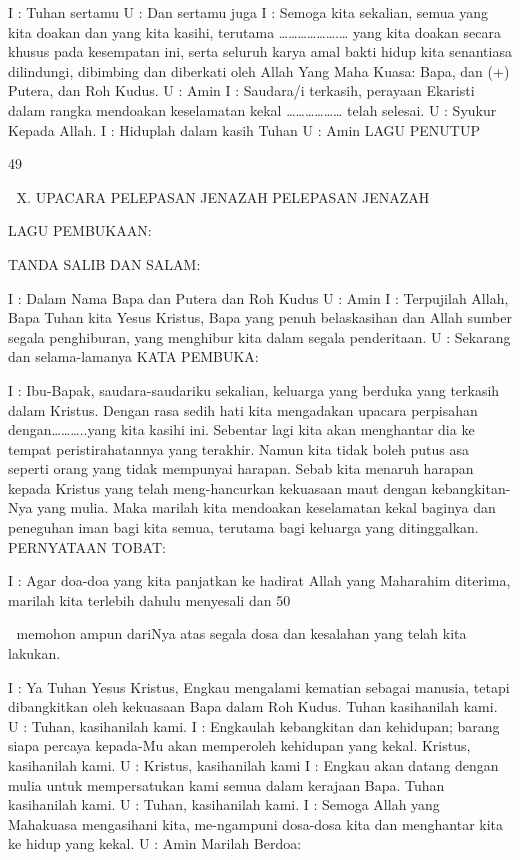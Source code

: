 \documentclass[10pt,a5paper,fancyhdr]{memoir}
\begin{document}
I : Tuhan sertamu 
U : Dan sertamu juga 
I : Semoga kita sekalian, semua yang kita doakan dan yang kita 
kasihi, terutama ……………….… yang kita doakan secara khusus 
pada kesempatan ini, serta seluruh karya amal bakti hidup kita 
senantiasa dilindungi, dibimbing dan diberkati oleh Allah Yang 
Maha Kuasa: Bapa, dan (+) Putera, dan Roh Kudus. 
U : Amin 
I : Saudara/i terkasih, perayaan Ekaristi dalam rangka mendoakan 
keselamatan kekal ……………… telah selesai. 
U : Syukur Kepada Allah. 
I : Hiduplah dalam kasih Tuhan 
U : Amin 
LAGU PENUTUP 

49 



X. UPACARA PELEPASAN JENAZAH 
PELEPASAN JENAZAH 

LAGU PEMBUKAAN: 

TANDA SALIB DAN SALAM: 

I : Dalam Nama Bapa dan Putera dan Roh Kudus 
U : Amin 
I : Terpujilah Allah, Bapa Tuhan kita Yesus Kristus, Bapa yang 
penuh belaskasihan dan Allah sumber segala penghiburan, yang 
menghibur kita dalam segala penderitaan. 
U : Sekarang dan selama-lamanya 
KATA PEMBUKA: 

I : Ibu-Bapak, saudara-saudariku sekalian, keluarga yang berduka 
yang terkasih dalam Kristus. Dengan rasa sedih hati kita mengadakan 
upacara perpisahan dengan………..yang kita kasihi ini. Sebentar lagi 
kita akan menghantar dia ke tempat peristirahatannya yang terakhir. 
Namun kita tidak boleh putus asa seperti orang yang tidak 
mempunyai harapan. Sebab kita menaruh harapan kepada Kristus 
yang telah meng-hancurkan kekuasaan maut dengan kebangkitan-
Nya yang mulia. Maka marilah kita mendoakan keselamatan kekal 
baginya dan peneguhan iman bagi kita semua, terutama bagi keluarga 
yang ditinggalkan. 
PERNYATAAN TOBAT: 

I : Agar doa-doa yang kita panjatkan ke hadirat Allah yang 
Maharahim diterima, marilah kita terlebih dahulu menyesali dan 
50 



memohon ampun dariNya atas segala dosa dan kesalahan yang telah 
kita lakukan. 

I : Ya Tuhan Yesus Kristus, Engkau mengalami kematian sebagai 
manusia, tetapi dibangkitkan oleh kekuasaan Bapa dalam Roh Kudus. 
Tuhan kasihanilah kami. 
U : Tuhan, kasihanilah kami. 
I : Engkaulah kebangkitan dan kehidupan; barang siapa percaya 
kepada-Mu akan memperoleh kehidupan yang kekal. Kristus, 
kasihanilah kami. 
U : Kristus, kasihanilah kami 
I : Engkau akan datang dengan mulia untuk mempersatukan kami 
semua dalam kerajaan Bapa. Tuhan kasihanilah kami. 
U : Tuhan, kasihanilah kami. 
I : Semoga Allah yang Mahakuasa mengasihani kita, me-ngampuni 
dosa-dosa kita dan menghantar kita ke hidup yang kekal. 
U : Amin 
Marilah Berdoa: 
\end{document}
